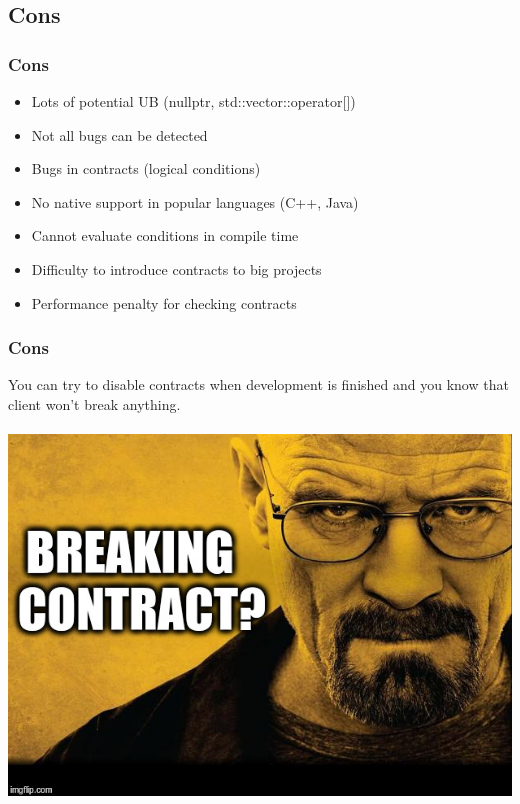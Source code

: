 \documentclass{beamer}
\begin{document}
\subsection{Cons}
\begin{frame}
\frametitle{Cons}
\begin{itemize}
  \item Lots of potential UB (nullptr, std::vector::operator[])
  \item Not all bugs can be detected
  \item Bugs in contracts (logical conditions)
  \item No native support in popular languages (C++, Java)
  \item Cannot evaluate conditions in compile time
  \item Difficulty to introduce contracts to big projects
  \item Performance penalty for checking contracts
\end{itemize}
\end{frame}

\begin{frame}
\frametitle{Cons}
\begin{center}
You can try to disable contracts when development is finished and you know that client won't break anything. \\~\\
\includegraphics[scale=0.35]{breaking_contract}
\end{center}
\end{frame}
\end{document}
